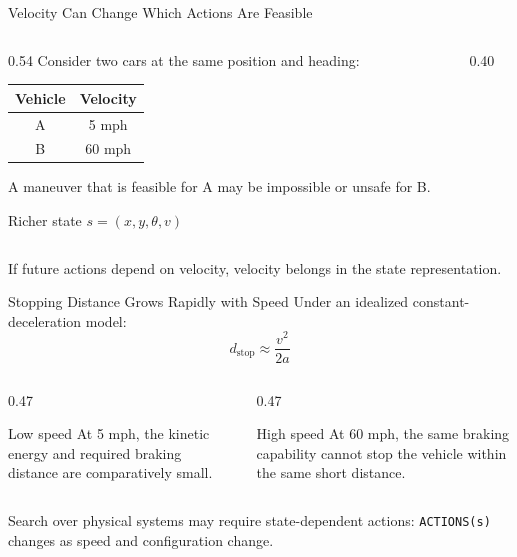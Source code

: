 \documentclass[aspectratio=169,10pt]{beamer}
\begin{document}
\begin{frame}[shrink=20]{Velocity Can Change Which Actions Are Feasible}
  \begin{columns}[T,onlytextwidth]
    \begin{column}{0.54\textwidth}
      Consider two cars at the same position and heading:

      \begin{center}
      \renewcommand{\arraystretch}{1.25}
      \begin{tabular}{c|c}
        \textbf{Vehicle} & \textbf{Velocity} \\\hline
        A & 5 mph \\
        B & 60 mph
      \end{tabular}
      \end{center}

      A maneuver that is feasible for A may be impossible or unsafe for B.

      \begin{block}{Richer state}
        \centering
        $s=(x,y,\theta,v)$
      \end{block}
    \end{column}

    \begin{column}{0.40\textwidth}
    \end{column}
  \end{columns}

  \begin{keyidea}
    If future actions depend on velocity, velocity belongs in the state representation.
  \end{keyidea}
\end{frame}

\begin{frame}[shrink=20]{Stopping Distance Grows Rapidly with Speed}
  Under an idealized constant-deceleration model:
  \[
    d_{\text{stop}} \approx \frac{v^2}{2a}
  \]

  \begin{columns}[T,onlytextwidth]
    \begin{column}{0.47\textwidth}
      \begin{block}{Low speed}
        At 5 mph, the kinetic energy and required braking distance are comparatively small.
      \end{block}
    \end{column}

    \begin{column}{0.47\textwidth}
      \begin{block}{High speed}
        At 60 mph, the same braking capability cannot stop the vehicle within the same short distance.
      \end{block}
    \end{column}
  \end{columns}

  \begin{keyidea}
    Search over physical systems may require state-dependent actions: \texttt{ACTIONS(s)} changes as speed and configuration change.
  \end{keyidea}
\end{frame}
\end{document}
